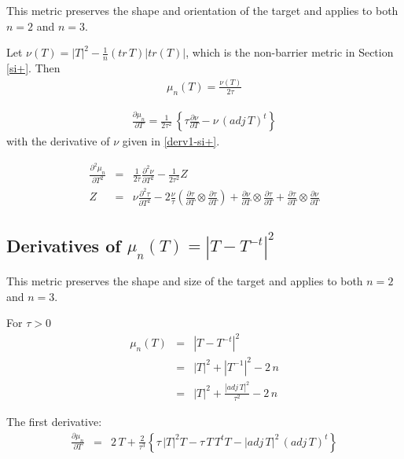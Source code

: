 \documentclass{report}
\begin{document}
\noindent This metric preserves the shape and orientation of the target and
applies to both $n=2$ and $n=3$. \newline

\noindent Let $\nu(T) = |T|^2 - \frac{1}{n} (tr \, T) |tr(T)|$, which is the 
non-barrier metric in Section \ref{si+}. Then
\begin{eqnarray}
\mu_n(T) = \frac{\nu(T)}{2 \tau}
\end{eqnarray}

\begin{eqnarray}
\frac{\partial \mu_n}{\partial T} = \frac{1}{2 \tau^2} \, \left\{ \tau \frac{\partial \nu}{\partial T} - \nu \, (adj \, T)^t \right\}
\end{eqnarray}
with the derivative of $\nu$ given in \ref{derv1-si+}. \newline

\begin{eqnarray}
\frac{\partial^2 \mu_n}{\partial T^2} & = & \frac{1}{2 \tau} \frac{\partial^2 \nu}{\partial T^2} - \frac{1}{2 \tau^2} Z \\
Z & = & \nu \frac{\partial^2 \tau}{\partial T^2} - 2 \frac{\nu}{\tau} \left( \frac{\partial \tau}{\partial T} \otimes \frac{\partial \tau}{\partial T} \right) + \frac{\partial \nu}{\partial T} \otimes \frac{\partial \tau}{\partial T} + \frac{\partial \tau}{\partial T} \otimes \frac{\partial \nu}{\partial T}
\end{eqnarray}

\subsection{Derivatives of $\mu_n(T)=|T-T^{-t}|^2$ \label{ss+1} }

\noindent This metric preserves the shape and size of the target and applies
to both $n=2$ and $n=3$. \newline

\noindent For $\tau>0$
\begin{eqnarray}
\mu_n(T) & = & |T-T^{-t}|^2 \\
         & = & |T|^2 + |T^{-1}|^2 - 2 \, n \\
         & = & |T|^2 + \frac{|adj \, T|^2}{\tau^2} - 2 \, n
\end{eqnarray}

\noindent The first derivative:
\begin{eqnarray}
\frac{\partial \mu_n}{\partial T} & = & 2 \, T + \frac{2}{\tau^3} \left\{ \tau \, |T|^2 T - \tau \, T \, T^t T - |adj \, T|^2 \, (adj \, T)^t \right\}
\end{eqnarray}
\end{document}
